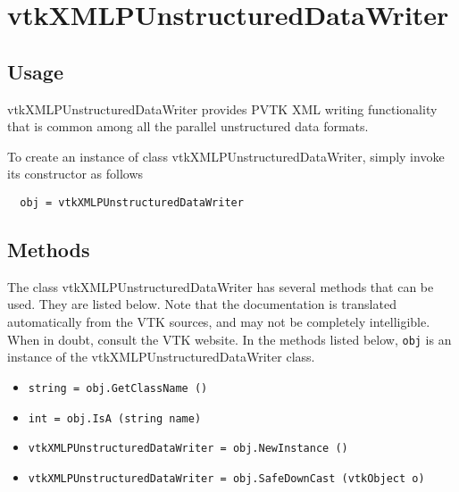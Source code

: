 \section{vtkXMLPUnstructuredDataWriter}

\subsection{Usage}

 vtkXMLPUnstructuredDataWriter provides PVTK XML writing
 functionality that is common among all the parallel unstructured
 data formats.

To create an instance of class vtkXMLPUnstructuredDataWriter, simply
invoke its constructor as follows
\begin{verbatim}
  obj = vtkXMLPUnstructuredDataWriter
\end{verbatim}
\subsection{Methods}

The class vtkXMLPUnstructuredDataWriter has several methods that can be used.
  They are listed below.
Note that the documentation is translated automatically from the VTK sources,
and may not be completely intelligible.  When in doubt, consult the VTK website.
In the methods listed below, \verb|obj| is an instance of the vtkXMLPUnstructuredDataWriter class.
\begin{itemize}
\item  \verb|string = obj.GetClassName ()|

\item  \verb|int = obj.IsA (string name)|

\item  \verb|vtkXMLPUnstructuredDataWriter = obj.NewInstance ()|

\item  \verb|vtkXMLPUnstructuredDataWriter = obj.SafeDownCast (vtkObject o)|

\end{itemize}
